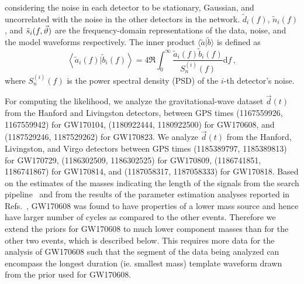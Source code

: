considering the noise in each detector to be stationary, Gaussian, and uncorrelated with the noise in the other detectors in the network. $\tilde{d}_{i}(f)$, $\tilde{n}_{i}(f)$, and $\tilde{s}_{i}(f, \vec{\vartheta})$ are the
frequency-domain representations of the data, noise, and the model waveforms respectively. The inner product $\langle\tilde{a} | \tilde{b}\rangle$ is defined as 
\begin{equation}
\left<\tilde{a}_i(f) | \tilde{b}_i(f)\right> = 4\Re \int_{0}^{\infty} \frac{\tilde{a}_i(f) \tilde{b}_i(f)}{S^{(i)}_n(f)} \mathrm{d}f \,,
\end{equation}
where $S^{(i)}_n(f)$ is the power spectral density (PSD) of the $i$-th detector's noise.

For computing the likelihood, we analyze the  gravitational-wave dataset $\vec d(t)$ from the Hanford and Livingston detectors, between GPS times (1167559926, 1167559942) for GW170104, (1180922444, 1180922500) for GW170608, and (1187529246, 1187529262) for GW170823. We analyze $\vec d(t)$ from the Hanford, Livingston, and Virgo detectors between GPS times (1185389797, 1185389813) for GW170729, (1186302509, 1186302525) for GW170809, (1186741851, 1186741867) for GW170814, and (1187058317, 1187058333) for GW170818. Based on the estimates of the masses indicating the length of the signals from the search pipeline~\cite{alex_nitz_2018_1410598,Usman:2015kfa,Canton:2014ena,Nitz:2017svb,TheLIGOScientific:2016qqj} and from the results of the parameter estimation analyses reported in Refs.~\cite{Abbott:2017gyy,Abbott:2017vtc,Abbott:2017oio,LIGOScientific:2018mvr}, GW170608 was found to have properties of a lower mass source and hence have larger number of cycles as compared to the other events. Therefore we extend the priors for GW170608 to much lower component masses than for the other two events, which is described below.
This requires more data for the analysis of GW170608 such that the segment of the data being analyzed can encompass the longest duration (ie. smallest mass) template waveform drawn from the prior used for GW170608.


